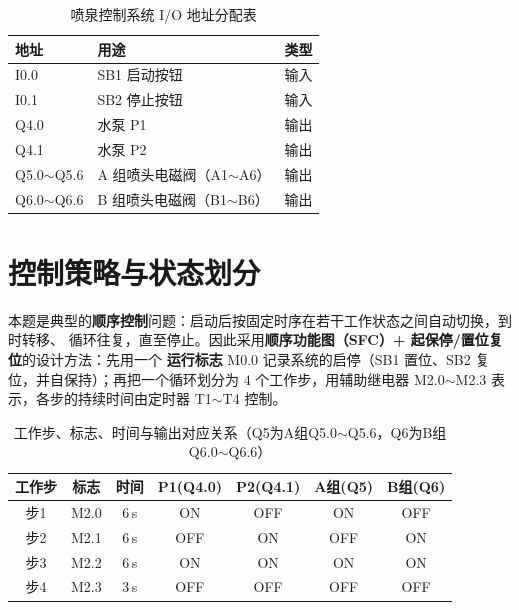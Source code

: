 \documentclass[12pt,a4paper]{ctexart}
\begin{document}
\begin{table}[htbp]
  \centering
  \caption{喷泉控制系统 I/O 地址分配表}
  \label{tab:io}
  \renewcommand{\arraystretch}{1.25}
  \begin{tabular}{>{\centering\arraybackslash}p{3.2cm} >{\raggedright\arraybackslash}p{6.5cm} c}
    \toprule
    \textbf{地址} & \textbf{用途} & \textbf{类型} \\
    \midrule
    I0.0        & SB1 启动按钮        & 输入 \\
    I0.1        & SB2 停止按钮        & 输入 \\
    Q4.0        & 水泵 P1            & 输出 \\
    Q4.1        & 水泵 P2            & 输出 \\
    Q5.0$\sim$Q5.6 & A 组喷头电磁阀（A1$\sim$A6） & 输出 \\
    Q6.0$\sim$Q6.6 & B 组喷头电磁阀（B1$\sim$B6） & 输出 \\
    \bottomrule
  \end{tabular}
\end{table}

\section{控制策略与状态划分}
本题是典型的\textbf{顺序控制}问题：启动后按固定时序在若干工作状态之间自动切换，到时转移、
循环往复，直至停止。因此采用\textbf{顺序功能图（SFC）+ 起保停/置位复位}的设计方法：先用一个
\textbf{运行标志} M0.0 记录系统的启停（SB1 置位、SB2 复位，并自保持）；再把一个循环划分为
$4$ 个工作步，用辅助继电器 M2.0$\sim$M2.3 表示，各步的持续时间由定时器 T1$\sim$T4 控制。

\begin{table}[htbp]
  \centering
  \caption{工作步、标志、时间与输出对应关系（Q5为A组Q5.0$\sim$Q5.6，Q6为B组Q6.0$\sim$Q6.6）}
  \label{tab:steps}
  \renewcommand{\arraystretch}{1.3}
  \begin{tabular}{c c c c c c c}
    \toprule
    \textbf{工作步} & \textbf{标志} & \textbf{时间} & \textbf{P1(Q4.0)} & \textbf{P2(Q4.1)} & \textbf{A组(Q5)} & \textbf{B组(Q6)} \\
    \midrule
    步1 & M2.0 & 6\,s & ON  & OFF & ON  & OFF \\
    步2 & M2.1 & 6\,s & OFF & ON  & OFF & ON  \\
    步3 & M2.2 & 6\,s & ON  & ON  & ON  & ON  \\
    步4 & M2.3 & 3\,s & OFF & OFF & OFF & OFF \\
    \bottomrule
  \end{tabular}
\end{table}
\end{document}
